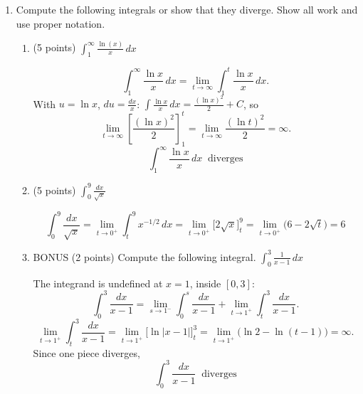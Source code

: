 \documentclass[12pt]{article}
\newcommand{\ds}{\displaystyle}
\begin{document}
\begin{enumerate}
\begin{enumerate}
    \end{enumerate}

    \newpage

  \item Compute the following integrals or show that they
    diverge. Show all work and use proper notation.
    \begin{enumerate}
    \item (5 points) $\ds \int_1^{\infty} \frac{\ln(x)}{x} \, dx$
      \begin{solution}
        \[
          \int_1^{\infty} \frac{\ln x}{x}\,dx = \lim_{t\to\infty} \int_1^t \frac{\ln x}{x}\,dx.
        \]
        With $u = \ln x$, $du = \frac{dx}{x}$: $\ds\int \frac{\ln x}{x}\,dx = \frac{(\ln x)^2}{2} + C$, so
        \[
          \lim_{t\to\infty} \left[\frac{(\ln x)^2}{2}\right]_1^t
          = \lim_{t\to\infty} \frac{(\ln t)^2}{2} = \infty.
        \]
        \[
          \boxed{\int_1^{\infty} \frac{\ln x}{x}\,dx \ \text{ diverges}}
        \]
      \end{solution}
      \vfill
      
    \item (5 points) $\ds \int_0^9 \frac{dx}{\sqrt{x}}$
      \begin{solution}
        \[
          \int_0^9 \frac{dx}{\sqrt{x}} = \lim_{t\to 0^+} \int_t^9 x^{-1/2}\,dx
          = \lim_{t\to 0^+} \Big[2\sqrt{x}\Big]_t^9
          = \lim_{t\to 0^+}\big(6 - 2\sqrt{t}\big) = \boxed{6}
        \]
      \end{solution}
      \vfill
      

    \item BONUS (2 points) Compute the following integral. $\ds \int_0^3 \frac{1}{x-1}
    \, dx$
      \begin{solution}
        The integrand is undefined at $x = 1$, inside $[0,3]$:
        \[
          \int_0^3 \frac{dx}{x-1} = \lim_{s\to 1^-} \int_0^s \frac{dx}{x-1} + \lim_{t\to 1^+} \int_t^3 \frac{dx}{x-1}.
        \]
        \[
          \lim_{t\to 1^+} \int_t^3 \frac{dx}{x-1} = \lim_{t\to 1^+} \Big[\ln|x-1|\Big]_t^3
          = \lim_{t\to 1^+}\big(\ln 2 - \ln(t-1)\big) = \infty.
        \]
        Since one piece diverges,
        \[
          \boxed{\int_0^3 \frac{dx}{x-1} \ \text{ diverges}}
        \]
      \end{solution}
    \vfill

  \end{enumerate}

\end{enumerate}
\end{document}
